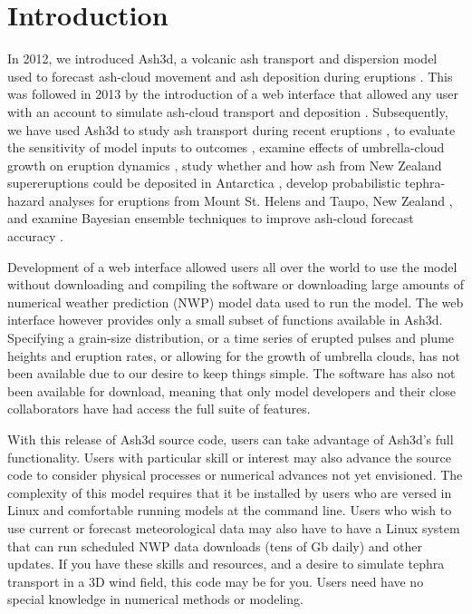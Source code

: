 \chapter{Introduction}\label{ChapIntro}
In 2012, we introduced Ash3d, a volcanic ash transport and dispersion model
used to forecast ash-cloud movement and ash deposition during eruptions \cite{Schwaiger12}.
This was followed in 2013 by the introduction of a web interface that allowed any user
with an account to simulate ash-cloud transport and deposition \cite{Mastin13b}.
Subsequently, we have used Ash3d to study ash transport during recent
eruptions \cite{Mastin13a}, to evaluate the sensitivity of model inputs to
outcomes \cite{Mastin16}, examine effects of umbrella-cloud growth on eruption
dynamics \cite{Mastin14,Mastin20a},  study whether and how ash from New Zealand
supereruptions could be deposited in Antarctica \cite{Dunbar17}, develop
probabilistic tephra-hazard analyses for eruptions from Mount St. Helens \cite{Mastin20b}
and Taupo, New Zealand \cite{Barker19}, and examine Bayesian ensemble techniques
to improve ash-cloud forecast accuracy \cite{Denlinger12}.

Development of a web interface allowed users all over the world to use the model
without downloading and compiling the software or downloading large amounts of
numerical weather prediction (NWP) model data used to run the model.  The web
interface however provides only a small subset of functions available in Ash3d.
Specifying a grain-size distribution, or a time series of erupted pulses and
plume heights and eruption rates, or allowing for the growth of umbrella clouds,
has not been available due to our desire to keep things simple.  The software has
also not been available for download, meaning that only model developers and their
close collaborators have had access the full suite of features.

With this release of Ash3d source code, users can take advantage of Ash3d's full
functionality.  Users with particular skill or interest may also advance the
source code to consider physical processes or numerical advances not yet envisioned.
The complexity of this model requires that it be installed by users who are versed
in Linux and comfortable running models at the command line.  Users who wish to use
current or forecast meteorological data may also have to have a Linux system that
can run scheduled NWP data downloads (tens of Gb daily) and other updates.  If you
have these skills and resources, and a desire to simulate tephra transport in a 3D
wind field, this code may be for you. Users need have no special knowledge in
numerical methods or modeling.

